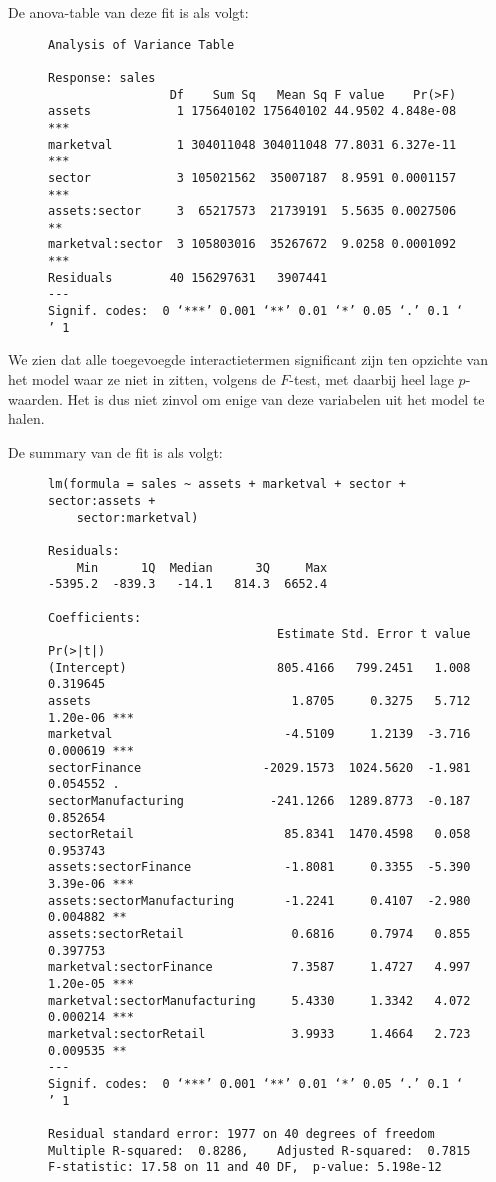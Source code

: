 \documentclass[a4paper]{report}
\begin{document}
  De anova-table van deze fit is als volgt:
  \begin{figure}
  \begin{verbatim}
Analysis of Variance Table

Response: sales
                 Df    Sum Sq   Mean Sq F value    Pr(>F)    
assets            1 175640102 175640102 44.9502 4.848e-08 ***
marketval         1 304011048 304011048 77.8031 6.327e-11 ***
sector            3 105021562  35007187  8.9591 0.0001157 ***
assets:sector     3  65217573  21739191  5.5635 0.0027506 ** 
marketval:sector  3 105803016  35267672  9.0258 0.0001092 ***
Residuals        40 156297631   3907441                      
---
Signif. codes:  0 ‘***’ 0.001 ‘**’ 0.01 ‘*’ 0.05 ‘.’ 0.1 ‘ ’ 1
  \end{verbatim}
  \end{figure}
  
  We zien dat alle toegevoegde interactietermen significant zijn ten opzichte van het model waar ze niet in zitten, volgens de $F$-test, met daarbij heel lage $p$-waarden. Het is dus niet zinvol om enige van deze variabelen uit het model te halen.
  
  De summary van de fit is als volgt:
\begin{figure}
\begin{verbatim}
lm(formula = sales ~ assets + marketval + sector + sector:assets + 
    sector:marketval)

Residuals:
    Min      1Q  Median      3Q     Max 
-5395.2  -839.3   -14.1   814.3  6652.4 

Coefficients:
                                Estimate Std. Error t value Pr(>|t|)    
(Intercept)                     805.4166   799.2451   1.008 0.319645    
assets                            1.8705     0.3275   5.712 1.20e-06 ***
marketval                        -4.5109     1.2139  -3.716 0.000619 ***
sectorFinance                 -2029.1573  1024.5620  -1.981 0.054552 .  
sectorManufacturing            -241.1266  1289.8773  -0.187 0.852654    
sectorRetail                     85.8341  1470.4598   0.058 0.953743    
assets:sectorFinance             -1.8081     0.3355  -5.390 3.39e-06 ***
assets:sectorManufacturing       -1.2241     0.4107  -2.980 0.004882 ** 
assets:sectorRetail               0.6816     0.7974   0.855 0.397753    
marketval:sectorFinance           7.3587     1.4727   4.997 1.20e-05 ***
marketval:sectorManufacturing     5.4330     1.3342   4.072 0.000214 ***
marketval:sectorRetail            3.9933     1.4664   2.723 0.009535 ** 
---
Signif. codes:  0 ‘***’ 0.001 ‘**’ 0.01 ‘*’ 0.05 ‘.’ 0.1 ‘ ’ 1

Residual standard error: 1977 on 40 degrees of freedom
Multiple R-squared:  0.8286,	Adjusted R-squared:  0.7815 
F-statistic: 17.58 on 11 and 40 DF,  p-value: 5.198e-12
\end{verbatim}
\end{figure}
  
\end{document}
